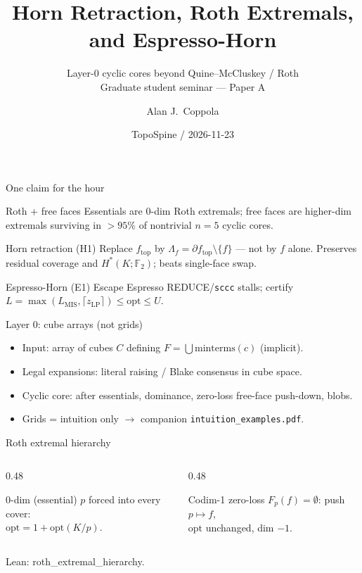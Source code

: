 \documentclass[aspectratio=169,11pt]{beamer}
\title{Horn Retraction, Roth Extremals, and Espresso-Horn}
\subtitle{Layer-0 cyclic cores beyond Quine--McCluskey / Roth\\[0.4em]
{\normalsize Graduate student seminar --- Paper A}}
\author{Alan J.\ Coppola}
\date{TopoSpine / 2026-11-23}
\begin{document}
\begin{frame}
\titlepage
\end{frame}

\begin{frame}{One claim for the hour}
\begin{block}{Roth + free faces}
Essentials are $0$-dim Roth extremals; free faces are higher-dim extremals
surviving in $>95\%$ of nontrivial $n=5$ cyclic cores.
\end{block}
\vspace{0.3em}
\begin{block}{Horn retraction (H1)}
Replace $f_{\mathrm{top}}$ by $\Lambda_f=\partial f_{\mathrm{top}}\setminus\{f\}$
--- not by $f$ alone.  Preserves residual coverage and $H^*(K;\mathbb{F}_2)$;
beats single-face swap.
\end{block}
\vspace{0.3em}
\begin{block}{Espresso-Horn (E1)}
Escape Espresso \textsf{REDUCE}/\texttt{sccc} stalls; certify
$L=\max(L_{\mathrm{MIS}},\lceil z_{\mathrm{LP}}\rceil)\le\mathrm{opt}\le U$.
\end{block}
\end{frame}

\begin{frame}{Layer 0: cube arrays (not grids)}
\begin{itemize}
\item Input: array of cubes $C$ defining $F=\bigcup\mathrm{minterms}(c)$ (implicit).
\item Legal expansions: literal raising / Blake consensus in cube space.
\item Cyclic core: after essentials, dominance, zero-loss free-face push-down, blobs.
\item Grids = intuition only $\to$ companion \texttt{intuition\_examples.pdf}.
\end{itemize}
\end{frame}

\begin{frame}{Roth extremal hierarchy}
\begin{columns}[T]
\begin{column}{0.48\textwidth}
\begin{block}{$0$-dim (essential)}
$p$ forced into every cover:\\
$\mathrm{opt}=1+\mathrm{opt}(K/p)$.
\end{block}
\end{column}
\begin{column}{0.48\textwidth}
\begin{block}{Codim-1 zero-loss}
$F_p(f)=\emptyset$: push $p\mapsto f$,\\
$\mathrm{opt}$ unchanged, dim $-1$.
\end{block}
\end{column}
\end{columns}
\vspace{0.8em}
Lean: \textsf{roth\_extremal\_hierarchy}.
\end{frame}
\end{document}
